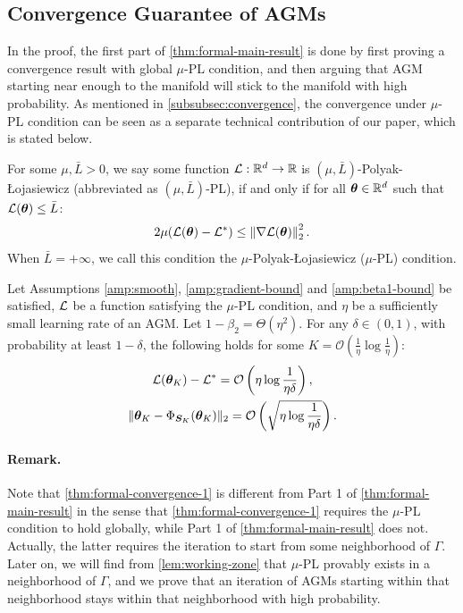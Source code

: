 \subsection{Convergence Guarantee of AGMs}

In the proof, the first part of \cref{thm:formal-main-result} is done by first proving a convergence result with global $\mu$-PL condition, and then arguing that AGM starting near enough to the manifold will stick to the manifold with high probability. As mentioned in \cref{subsubsec:convergence}, the convergence under $\mu$-PL condition can be seen as a separate technical contribution of our paper, which is stated below.

\begin{definition}
    \label{def:mu-pl}
    For some $\mu, \bar{L} > 0$, we say some function $\mathcal{L}:\mathbb{R}^d \to \mathbb{R}$ is $(\mu, \bar{L})$-Polyak-Łojasiewicz (abbreviated as $(\mu, \bar{L})$-PL), if and only if for all ${\bm{\theta}} \in \mathbb{R}^d$ such that $\mathcal{L}({\bm{\theta}}) \leq \bar{L}$:
    $$2\mu(\mathcal{L}({\bm{\theta}})-\mathcal{L}^*) \leq \left\|\nabla \mathcal{L}({\bm{\theta}})\right\|_2^2.$$
    When $\bar{L} = +\infty$, we call this condition the $\mu$-Polyak-Łojasiewicz ($\mu$-PL) condition.
\end{definition}


\begin{theorem}\label{thm:formal-convergence-1}
    Let Assumptions \ref{amp:smooth}, \ref{amp:gradient-bound} and \ref{amp:beta1-bound} be satisfied, $\mathcal{L}$ be a function satisfying the $\mu$-PL condition, and $\eta$ be a sufficiently small learning rate of an AGM. Let $1-\beta_2 = \Theta(\eta^2)$. For any $\delta \in (0,1)$, with probability at least $1 - \delta$, the following holds for some $K = \mathcal{O}(\frac{1}{\eta} \log \frac{1}{\eta})$:
    \begin{gather*}
        \mathcal{L}({\bm{\theta}}_K) - \mathcal{L}^* = \mathcal{O}\left(\eta\log\frac{1}{\eta\delta}\right),\\
        \|{\bm{\theta}}_K -\Phi_{{\bm{S}}_K}({\bm{\theta}}_K)\|_2 = \mathcal{O}\left(\sqrt{\eta\log\frac{1}{\eta\delta}}\right).
    \end{gather*} 
\end{theorem}

\paragraph{Remark.} Note that \cref{thm:formal-convergence-1} is different from Part 1 of \cref{thm:formal-main-result} in the sense that \cref{thm:formal-convergence-1} requires the $\mu$-PL condition to hold globally, while Part 1 of \cref{thm:formal-main-result} does not. Actually, the latter requires the iteration to start from some neighborhood of $\Gamma$. Later on, we will find from \cref{lem:working-zone} that $\mu$-PL provably exists in a neighborhood of $\Gamma$, and we prove that an iteration of AGMs starting within that neighborhood stays within that neighborhood with high probability.

